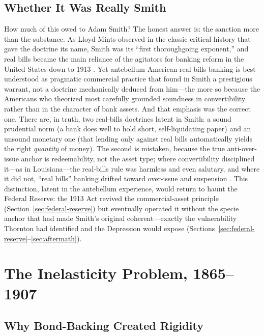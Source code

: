 \documentclass[12pt]{article}
\begin{document}
\subsection{Whether It Was Really Smith}

How much of this owed to Adam Smith?  The honest answer is: the sanction more than
the substance.  As Lloyd Mints observed in the classic critical history that gave
the doctrine its name, Smith was its ``first thoroughgoing exponent,'' and real
bills became the main reliance of the agitators for banking reform in the United
States down to 1913 \citep{mints1945}.  Yet antebellum American real-bills banking
is best understood as pragmatic commercial practice that found in Smith a
prestigious warrant, not a doctrine mechanically deduced from him---the more so
because the Americans who theorized most carefully grounded soundness in
convertibility rather than in the character of bank assets.  And that emphasis was
the correct one.  There are, in truth, two real-bills doctrines latent in Smith: a
sound prudential norm (a bank does well to hold short, self-liquidating paper) and
an unsound monetary one (that lending only against real bills automatically yields
the right \emph{quantity} of money).  The second is mistaken, because the true
anti-over-issue anchor is redeemability, not the asset type; where convertibility
disciplined it---as in Louisiana---the real-bills rule was harmless and even
salutary, and where it did not, ``real bills'' banking drifted toward over-issue
and suspension \citep{mints1945, humphrey1982realbills}.  This distinction, latent
in the antebellum experience, would return to haunt the Federal Reserve: the 1913
Act revived the commercial-asset principle (Section~\ref{sec:federal-reserve}) but
eventually operated it without the specie anchor that had made Smith's original
coherent---exactly the vulnerability Thornton had identified and the Depression
would expose (Sections~\ref{sec:federal-reserve}--\ref{sec:aftermath}).

\section{The Inelasticity Problem, 1865--1907}
\label{sec:inelasticity}

\subsection{Why Bond-Backing Created Rigidity}
\end{document}
